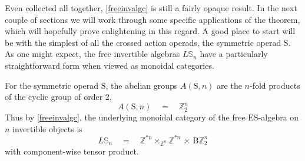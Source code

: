 \documentclass{amsbook} %
\numberwithin{section}{chapter}
\begin{document}
Even collected all together, \cref{freeinvalgc} is still a fairly opaque result. In the next couple of sections we will work through some specific applications of the theorem, which will hopefully prove enlightening in this regard. A good place to start will be with the simplest of all the crossed action operads, the symmetric operad $\mathrm{S}$. As one might expect, the free invertible algebras $L\mathbb{S}_n$ have a particularly straightforward form when viewed as monoidal categories.

\begin{prop} \label{invsymcat} For the symmetric operad $\mathrm{S}$, the abelian groups $A(\mathrm{S},n)$ are the $n$-fold products of the cyclic group of order 2,
\[ A(\mathrm{S},n) \quad = \quad \mathbb{Z}_2^{n} \]
Thus by \cref{freeinvalgc}, the underlying monoidal category of the free $\mathrm{ES}$-algebra on $n$ invertible objects is
\[ L\mathbb{S}_n \quad = \quad \mathbb{Z}^{\ast n} \times_{\mathbb{Z}^n} \mathbb{Z}^{\ast n}  \, \times \, \mathrm{B}\mathbb{Z}_2^{n} \]
with component-wise tensor product.
\end{prop}
\end{document}
